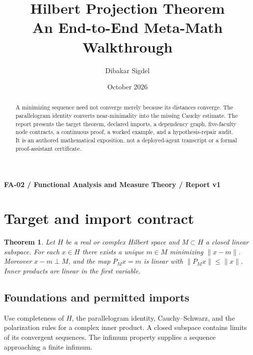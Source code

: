 \documentclass[preprint,12pt,aps,pra,showkeys,amsmath,amssymb,superscriptaddress,floatfix]{revtex4-2}
\newtheorem{theorem}{Theorem}[section]
\theoremstyle{definition}
\theoremstyle{remark}
\begin{document}
\title{Hilbert Projection Theorem\\[4pt]\large An End-to-End Meta-Math Walkthrough}

\author{Dibakar Sigdel}


\date{October 2026}

\begin{abstract}

A minimizing sequence need not converge merely because its distances
converge. The parallelogram identity converts near-minimality into the
missing Cauchy estimate. The report presents the target theorem,
declared imports, a dependency graph, five-faculty node contracts, a
continuous proof, a worked example, and a hypothesis-repair audit. It is
an authored mathematical exposition, not a deployed-agent transcript or
a formal proof-assistant certificate.

\end{abstract}\maketitle\linespread{1.12}\selectfont

\noindent\textbf{FA-02 / Functional Analysis and Measure Theory / Report v1}

\section{Target and import contract}

\begin{theorem}

Let \(H\) be a real or complex Hilbert space and \(M\subset H\) a closed
linear subspace. For each \(x\in H\) there exists a unique \(m\in M\)
minimizing \(\|x-m\|\). Moreover \(x-m\perp M\), and the map \(P_Mx=m\)
is linear with \(\|P_Mx\|\le\|x\|\). Inner products are linear in the
first variable.

\end{theorem}

\subsection{Foundations and permitted imports}

Use completeness of \(H\), the parallelogram identity, Cauchy--Schwarz,
and the polarization rules for a complex inner product. A closed
subspace contains limits of its convergent sequences. The infimum
property supplies a sequence approaching a finite infimum.
\end{document}
